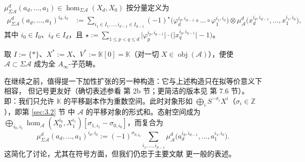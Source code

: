 \begin{Def}
\begin{itemize}
        $\mu^d_{\Sigma\mathcal A}(a_d,\dots,a_1)\in
        \hom_{\Sigma\mathcal A}(X_d,X_0)$ 按分量定义为
        \begin{equation}\label{eq:3.41}
          \begin{aligned}
            \mu^d_{\Sigma\mathcal A}(a_d,\dots,a_1)^{i_d,i_0}
            &:=\sum_{i_1\in I_1,\dots,i_{d-1}\in I_{d-1}}(-1)^{\star}
            \bigl(\varphi_d^{i_d,i_{d-1}}\circ\dots\circ
            \varphi_1^{i_1,i_0}\bigr)\otimes
            \mu^d_{\mathcal A}\bigl(x_d^{i_d,i_{d-1}},\dots,
            x_1^{i_1,i_0}\bigr),
          \end{aligned}
        \end{equation}
        其中 $i_0\in I_0$、$i_d\in I_d$，且
        $\star:=\sum_{1\le p<q\le d}\bigl|\varphi_p^{i_p,i_{p-1}}\bigr|
        \cdot\bigl(\bigl|x_q^{i_q,i_{q-1}}\bigr|-1\bigr)$。
\end{itemize}
\end{Def}

取 $I:=\{*\}$、$X^*:=X$、$V^*:=\mathbb K[0]=\mathbb K$（对一切
$X\in\operatorname{obj}(\mathcal A)$），便使
$\mathcal A\subset\Sigma\mathcal A$ 成为全 $A_\infty$-子范畴。

\begin{Rem}\label{rem:3.25}
在继续之前，值得提一下加性扩张的另一种构造：它与上述构造只在拟等价意义下相容，
但记号更友好（确切表述参看 \cite{Sei13} 第 2b 节；更简洁的版本见 \cite{Kel01}
第 7.6 节）。即：我们只允许 $\mathbb K$ 的平移副本作为重数空间。此时对象形如
$\bigoplus_i S^{-\sigma_i}X^i$（$\sigma_i\in\mathbb Z$），即第 \ref{sec:3.2} 节
中 $\mathcal A$ 的平移对象的形式和。态射空间成为
$\bigoplus_{i_0,i_1}\hom_{\mathcal A}(X_0^{i_0},X_1^{i_1})
[\sigma_{1,i_1}-\sigma_{0,i_0}]$，而复合为
\[
  \mu^d_{\Sigma\mathcal A}(a_d,\dots,a_1)^{i_d,i_0}
  :=(-1)^{\sigma_{0,i_0}}\sum_{i_1,\dots,i_{d-1}}
  \mu^d_{\mathcal A}\bigl(a_d^{i_d,i_{d-1}},\dots,a_1^{i_1,i_0}\bigr).
\]
这简化了讨论，尤其在符号方面，但我们仍忠于主要文献 \cite{Sei08} 更一般的表述。
\end{Rem}


